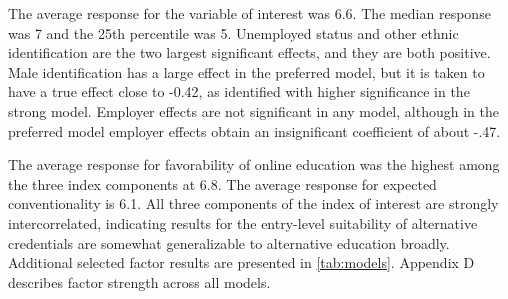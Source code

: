\documentclass[review]{elsarticle}
\begin{document}
        The average response for the variable of interest was 6.6.
        The median response was 7 and the 25th percentile was 5.
        Unemployed status and other ethnic identification are the two largest significant effects,
        and they are both positive.
        Male identification has a large effect in the preferred model, but it is taken to have a true
        effect close to -0.42,
        as identified with higher significance in the strong model.
        Employer effects are not significant in any model, although in the preferred
        model employer effects obtain an insignificant coefficient of about -.47.

        The average response for favorability of online education was the highest among the three
        index components at 6.8.
        The average response for expected conventionality is 6.1.
        All three components of the index of interest are strongly intercorrelated,
        indicating results for the entry-level suitability of alternative credentials
        are somewhat generalizable to alternative education broadly.
        Additional selected factor results are presented in \ref{tab:models}.
        Appendix D describes factor strength across all models.
        
\end{document}
